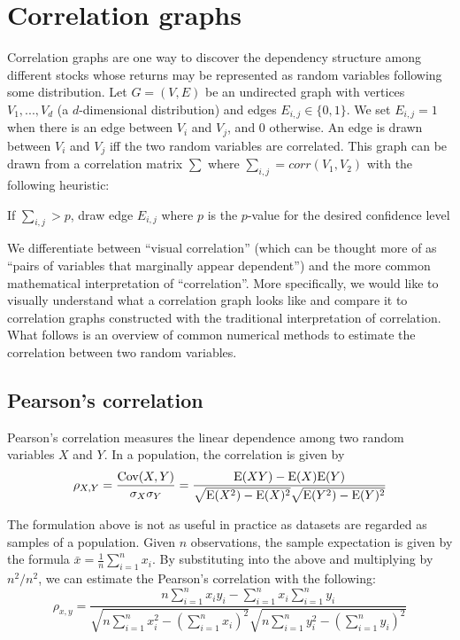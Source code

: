 \section{Correlation graphs}
\label{sec:intro:correlation}

Correlation graphs are one way to discover the dependency structure among
different stocks whose returns may be represented as random variables following
some distribution. Let $G=(V,E)$ be an undirected graph with vertices
$V_{1},...,V_{d}$ (a $d$-dimensional distribution) and edges
$E_{i,j}\in\{0,1\}$. We set $E_{i,j}=1$ when there is an edge between $V_i$ and
$V_j$, and 0 otherwise. An edge is drawn between $V_i$ and $V_j$ iff the two
random variables are correlated. This graph can be drawn from a correlation
matrix $\sum$ where $\sum_{i,j}=corr(V_1,V_2)$ with the following heuristic:\\

\begin{algorithm}
	If $\sum_{i,j}>p$, draw edge $E_{i,j}$ where $p$ is the $p$-value for the
	desired confidence level
\end{algorithm}

We differentiate between ``visual correlation'' (which can be thought more of as
``pairs of variables that marginally appear dependent'') and the more common
mathematical interpretation of ``correlation''. More specifically, we would like
to visually understand what a correlation graph looks like and compare it to
correlation graphs constructed with the traditional interpretation of
correlation. What follows is an overview of common numerical methods to estimate
the correlation between two random variables.

\subsection{Pearson's correlation}

Pearson's correlation measures the linear dependence among two random variables
$X$ and $Y$. In a population, the correlation is given by
$$\rho_{X,Y}=\frac{\mathrm{Cov}(X,Y)}{\sigma_X \sigma_Y} =
\frac{\mathrm{E}(XY)-\mathrm{E}(X)\mathrm{E}(Y)}{\sqrt{\mathrm{E}(X^2)-\mathrm{E}(X)^2} \sqrt{\mathrm{E}(Y^2)-\mathrm{E}(Y)^2}}$$ 

The formulation above is not as useful in practice as datasets are regarded as
samples of a population. Given $n$ observations, the sample expectation is given
by the formula  $\bar{x}=\frac{1}{n}\sum\limits_{i=1}^{n}x_i$. By substituting
into the above and multiplying by $n^2/n^2$, we can estimate the Pearson's
correlation with the following:
$$\rho_{x,y}=
\frac{n \sum\limits_{i=1}^{n} x_i y_i - \sum\limits_{i=1}^{n} x_i
	\sum\limits_{i=1}^{n} y_i}
{\sqrt{n\sum\limits_{i=1}^{n} x_i^2-\left(\sum\limits_{i=1}^{n} x_i\right)^2} 
	\sqrt{n\sum\limits_{i=1}^{n} y_i^2-\left(\sum\limits_{i=1}^{n} y_i\right)^2}}$$ 

